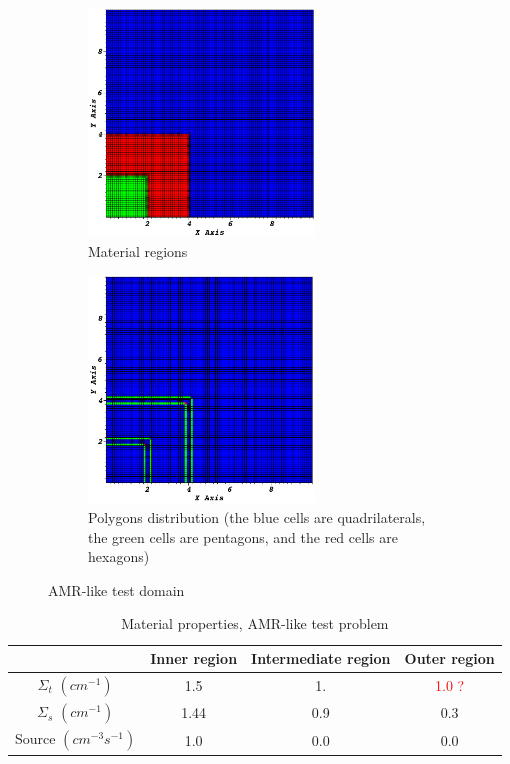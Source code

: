 %
\begin{figure}[!htbp]
  \centering
  \begin{subfigure}{0.75\textwidth}
    \centering
    \includegraphics[width=6cm]{zone_amr}
    \caption{Material regions}
    \label{mat_amr}
  \end{subfigure}
  \begin{subfigure}{0.75\textwidth}
    \centering
    \includegraphics[width=6cm]{polygon_amr}
    \caption{Polygons distribution (the blue cells are quadrilaterals, the green cells are pentagons, and the red cells are hexagons)}
    \label{fig_pol_dist}
  \end{subfigure}
  \caption{AMR-like test domain}
  \label{zone_amr}
\end{figure}
%
\begin{table}
  \begin{center}
    \caption{Material properties, AMR-like test problem}
    \begin{tabular}{|c|c|c|c|}
      \hline
      & Inner region & Intermediate region & Outer region  \\ \hline
    $\Sigma_t$ $(cm^{-1})$ & 1.5  & 1.  & \textcolor{red}{1.0 ?} \\
    $\Sigma_s$ $(cm^{-1})$ & 1.44 & 0.9 & 0.3 \\
  Source $(cm^{-3}s^{-1})$ & 1.0  & 0.0 & 0.0 \\
      \hline
    \end{tabular}
    \label{prop_amr}
  \end{center}
\end{table}
